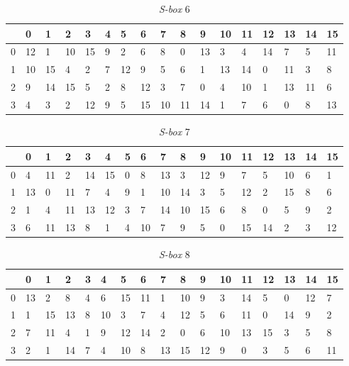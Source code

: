 \begin{enumerate}
\begin{table}[H]
	\begin{center}
		\begin{tabular}{|l|l|l|l|l|l|l|l|l|l|l|l|l|l|l|l|l|}
				\hline
				& 0 & 1	& 2 & 3 & 4 & 5 & 6 & 7 & 8 & 9 & 10 & 11 & 12 & 13 & 14 & 15	\\ \hline
			0	&	12	&	1	&	10	&	15	&	9	&	2	&	6	&	8	&	0	&	13	&	3	&	4	&	14	&	7	&	5	&	11	\\ \hline
			1	&	10	&	15	&	4	&	2	&	7	&	12	&	9	&	5	&	6	&	1	&	13	&	14	&	0	&	11	&	3	&	8	\\ \hline
			2	&	9	&	14	&	15	&	5	&	2	&	8	&	12	&	3	&	7	&	0	&	4	&	10	&	1	&	13	&	11	&	6	\\ \hline
			3	&	4	&	3	&	2	&	12	&	9	&	5	&	15	&	10	&	11	&	14	&	1	&	7	&	6	&	0	&	8	&	13	\\ \hline
		\end{tabular}
	\end{center}
	\label{table:s_box6}
	\caption{\textit{S-box} 6}
\end{table}

\begin{table}[H]
	\begin{center}
		\begin{tabular}{|l|l|l|l|l|l|l|l|l|l|l|l|l|l|l|l|l|}
				\hline
					& 0 & 1	& 2 & 3 & 4 & 5 & 6 & 7 & 8 & 9 & 10 & 11 & 12 & 13 & 14 & 15	\\ \hline
				0	&	4	&	11	&	2	&	14	&	15	&	0	&	8	&	13	&	3	&	12	&	9	&	7	&	5	&	10	&	6	&	1	\\ \hline
				1	&	13	&	0	&	11	&	7	&	4	&	9	&	1	&	10	&	14	&	3	&	5	&	12	&	2	&	15	&	8	&	6	\\ \hline
				2	&	1	&	4	&	11	&	13	&	12	&	3	&	7	&	14	&	10	&	15	&	6	&	8	&	0	&	5	&	9	&	2	\\ \hline
				3	&	6	&	11	&	13	&	8	&	1	&	4	&	10	&	7	&	9	&	5	&	0	&	15	&	14	&	2	&	3	&	12	\\ \hline
		\end{tabular}
	\end{center}
	\label{table:s_box7}
	\caption{\textit{S-box} 7}
\end{table}

\begin{table}[H]
	\begin{center}
		\begin{tabular}{|l|l|l|l|l|l|l|l|l|l|l|l|l|l|l|l|l|}
				\hline
				& 0 & 1	& 2 & 3 & 4 & 5 & 6 & 7 & 8 & 9 & 10 & 11 & 12 & 13 & 14 & 15	\\ \hline
			0	&	13	&	2	&	8	&	4	&	6	&	15	&	11	&	1	&	10	&	9	&	3	&	14	&	5	&	0	&	12	&	7	\\ \hline
			1	&	1	&	15	&	13	&	8	&	10	&	3	&	7	&	4	&	12	&	5	&	6	&	11	&	0	&	14	&	9	&	2	\\ \hline
			2	&	7	&	11	&	4	&	1	&	9	&	12	&	14	&	2	&	0	&	6	&	10	&	13	&	15	&	3	&	5	&	8	\\ \hline
			3	&	2	&	1	&	14	&	7	&	4	&	10	&	8	&	13	&	15	&	12	&	9	&	0	&	3	&	5	&	6	&	11	\\ \hline
		\end{tabular}
	\end{center}
	\label{table:s_box8}
	\caption{\textit{S-box} 8}
\end{table}


\end{enumerate}
